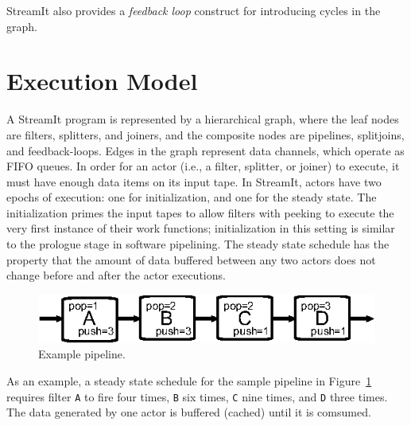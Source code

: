 StreamIt also provides a {\it feedback loop} construct for introducing
cycles in the graph.

\section{Execution Model}

A StreamIt program is represented by a hierarchical graph,
where the leaf nodes are filters, splitters, and joiners, and
the composite nodes are pipelines, splitjoins, and
feedback-loops. Edges in the graph represent data channels, which 
operate as FIFO queues.
In order for an actor  (i.e., a filter,
splitter, or joiner) to execute, it must have enough data items on its input
tape. In StreamIt, actors have  two epochs
of execution: one for initialization, and one for the steady
state. The initialization primes the input tapes to allow filters with
peeking to execute the very first instance of their work functions;
initialization in this setting is similar to the prologue stage in
software pipelining. The steady state schedule has the property that
the amount of data buffered between any two actors does not change
before and after the actor executions.

\begin{figure}[t]
\begin{center}
 \includegraphics[scale=1, angle=0]{./pipe-with-rates.eps}
 \caption{Example pipeline.}
 \label{fig:pipe-with-rates}
\end{center}
\end{figure}

As an example, a steady state schedule for the sample pipeline in
Figure~\ref{fig:pipe-with-rates} requires filter \texttt{A} to fire
four times, \texttt{B} six times, \texttt{C} nine times, and
\texttt{D} three times. 
The data generated by one actor is buffered (cached) until it is
comsumed.

